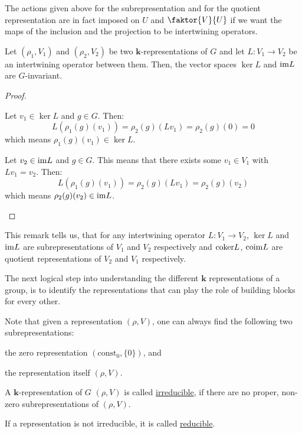 The actions given above for the subrepresentation and for the quotient representation are in fact imposed on $U$ and $\faktor{V}{U}$ if we want the maps of the inclusion and the projection to be intertwining operators.

\begin{remark} Let $(\rho_1,V_1)$ and $(\rho_2,V_2)$ be two $\mathbf{k}$-representations of $G$ and let $L:V_1\to V_2$ be an intertwining operator between them. Then, the vector spaces $\ker L$ and $\mathrm{im } L$ are $G$-invariant.
\end{remark}
\begin{proof} \begin{i_enum}
\item Let $v_1\in\ker L$ and $g\in G$. Then:
$$L(\rho_1(g)(v_1))=\rho_2(g)(Lv_1)=\rho_2(g)(0)=0$$
which means $\rho_1(g)(v_1)\in\ker L$.
\item Let $v_2\in\mathrm{im } L$ and $g\in G$. This means that there exists some $v_1\in V_1$ with $Lv_1=v_2$. Then:
$$L(\rho_1(g)(v_1))=\rho_2(g)(Lv_1)=\rho_2(g)(v_2)$$
which means $\rho_2(g)(v_2)\in\mathrm{im } L$.
\end{i_enum}
\end{proof}

This remark tells us, that for any intertwining operator $L:V_1\to V_2$, $\ker L$ and $\mathrm{im } L$ are subrepresentations of $V_1$ and $V_2$ respectively and $\mathrm{coker } L$, $\mathrm{coim } L$ are quotient representations of $V_2$ and $V_1$ respectively.

The next logical step into understanding the different $\mathbf{k}$ representations of a group, is to identify the representations that can play the role of building blocks for every other.

Note that given a representation $(\rho,V)$, one can always find the following two subrepresentations:
\begin{i_enum}
\item the zero representation $(\mathrm{const}_0,\{0\})$, and
\item the representation itself $(\rho,V)$.
\end{i_enum}

\begin{definition} A $\mathbf{k}$-representation of $G$ $(\rho,V)$ is called \ul{irreducible}, if there are no proper, non-zero subrepresentations of $(\rho,V)$.

If a representation is not irreducible, it is called \ul{reducible}.
\end{definition}

